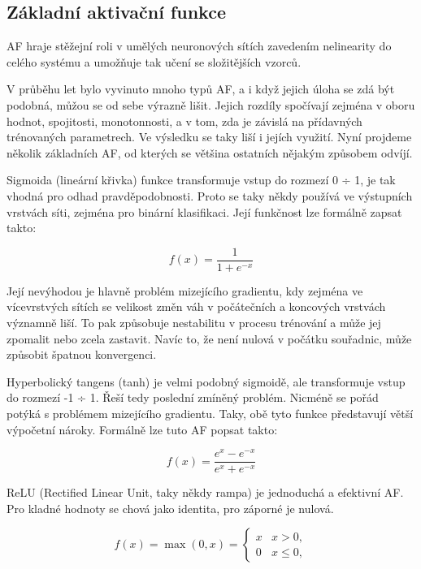 \subsection{Základní aktivační funkce}

AF hraje stěžejní roli v umělých neuronových sítích zavedením nelinearity do
celého systému a umožňuje tak učení se složitějších vzorců.

V průběhu let bylo vyvinuto mnoho typů AF, a i když jejich úloha se zdá být
podobná, můžou se od sebe výrazně lišit. Jejich rozdíly spočívají zejména v
oboru hodnot, spojitosti, monotonnosti, a v tom, zda je závislá na přídavných
trénovaných parametrech. Ve výsledku se taky liší i jejích využití. Nyní
projdeme několik základních AF, od kterých se většina ostatních nějakým
způsobem odvíjí.

Sigmoida (lineární křivka) funkce transformuje vstup do rozmezí 0 ÷ 1, je tak
vhodná pro odhad pravděpodobnosti. Proto se taky někdy používá ve výstupních
vrstvách síti, zejména pro binární klasifikaci. Její funkčnost lze formálně
zapsat takto:

\begin{equation*}
    f(x)= \frac{1}{1+e^{-x}}
\end{equation*}

Její nevýhodou je hlavně problém mizejícího gradientu, kdy zejména ve
vícevrstvých sítích se velikost změn váh v počátečních a koncových vrstvách
významně liší. To pak způsobuje nestabilitu v procesu trénování a může jej
zpomalit nebo zcela zastavit. Navíc to, že není nulová v počátku souřadnic,
může způsobit špatnou konvergenci.

Hyperbolický tangens (tanh) je velmi podobný sigmoidě, ale transformuje vstup
do rozmezí -1 ÷ 1. Řeší tedy poslední zmíněný problém. Nicméně se pořád potýká
s problémem mizejícího gradientu. Taky, obě tyto funkce představují větší
výpočetní nároky. Formálně lze tuto AF popsat takto:

\begin{equation*}
    f(x)= \frac{e^x-e^{-x}}{e^x+e^{-x}}
\end{equation*}

ReLU (Rectified Linear Unit, taky někdy rampa) je jednoduchá a efektivní AF.
Pro kladné hodnoty se chová jako identita, pro záporné je nulová.

\begin{equation*}
    f(x)=\max(0,x)=\begin{cases}x&x>0,\\0&x\leq0,\end{cases}
\end{equation*}

